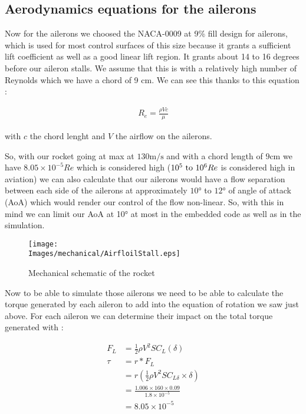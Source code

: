 \subsection{Aerodynamics equations for the ailerons}

Now for the ailerons we choosed the NACA-0009 at 9\% fill design for ailerons,
which is used for most control surfaces of this size because it grants a
sufficient lift coefficient as well as a good linear lift region. It grants
about 14 to 16 degrees before our aileron stalls. We assume that this is with a
relatively high number of Reynolds which we have a chord of 9 cm. We can see
this thanks to this equation :

\begin{gather*}
    R_e = \frac{\rho V c}{\mu}
\end{gather*}

with $c$ the chord lenght and $V$ the airflow on the ailerons.

So, with our rocket going at max at $130 \si{\meter\per\second}$ and with a
chord length of $9 \si{\centi\meter}$ we have $8.05 \times 10^{-5} Re$ which is
considered high ($10^5 \text{ to } 10^6 \space Re$ is considered high in
aviation) we can also calculate that our ailerons would have a flow separation
between each side of the ailerons at approximately $10 \si{\degree}$ to $12
    \si{\degree}$ of angle of attack (AoA) which would render our control of the
flow non-linear. So, with this in mind we can limit our AoA at 10° at most in
the embedded code as well as in the simulation.

\begin{figure}[!hbt]
    \centering
    \texttt{[image: \\Images/mechanical/AirfloilStall.eps]}
    \caption{Mechanical schematic of the rocket}
\end{figure}
\FloatBarrier

Now to be able to simulate those ailerons we need to be able to calculate the
torque generated by each aileron to add into the equation of rotation we saw
just above. For each aileron we can determine their impact on the total torque
generated with :

\begin{align*}
    F_L  & = \frac{1}{2} \rho V^2 S C_L (\delta)                     \\
    \tau & = r * F_L                                                 \\
         & = r ( \frac{1}{2} \rho V^2 S C_{L \delta} \times \delta)  \\
         & = \frac{1.006 \times 160 \times 0.09}{1.8 \times 10^{-5}} \\
         & = 8.05 \times 10^{-5}                                     \\
\end{align*}

